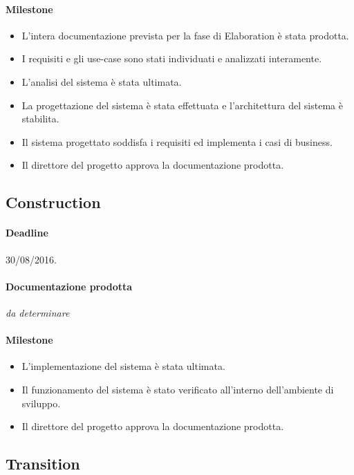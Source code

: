 \paragraph{Milestone}
\begin{itemize}
	\item L'intera documentazione prevista per la fase di Elaboration \`e stata prodotta.
	\item I requisiti e gli use-case sono stati individuati e analizzati interamente.
	\item L'analisi del sistema \`e stata ultimata.
	\item La progettazione del sistema \`e stata effettuata e l'architettura del sistema \`e stabilita.
	\item Il sistema progettato soddisfa i requisiti ed implementa i casi di business.
	\item Il direttore del progetto approva la documentazione prodotta.
\end{itemize}

\subsection{Construction}

\paragraph{Deadline}
30/08/2016.

\paragraph{Documentazione prodotta}
\emph{da determinare}

\paragraph{Milestone}
\begin{itemize}
	\item L'implementazione del sistema \`e stata ultimata.
	\item Il funzionamento del sistema \`e stato verificato all'interno dell'ambiente di sviluppo.
	\item Il direttore del progetto approva la documentazione prodotta.
\end{itemize}

\subsection{Transition}

